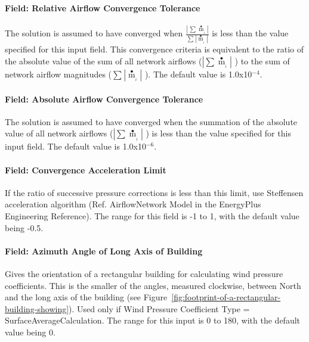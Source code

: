 \paragraph{Field: Relative Airflow Convergence Tolerance}\label{field-relative-airflow-convergence-tolerance}

The solution is assumed to have converged when \({\frac{{\left| {\,\sum\limits_{} {{{\mathop m\limits^ \bullet }_{_i}}} } \right|}}{\sum\limits_{} {\left| {{{\mathop m\limits^ \bullet }_{_i}}} \right|} }}\) is less than the value specified for this input field. This convergence criteria is equivalent to the ratio of the absolute value of the sum of all network airflows (\(\left| {\sum {{{\mathop m\limits^ \bullet }_{_i}}} } \right|\) ) to the sum of network airflow magnitudes (\(\sum\limits_{}^{} {\left| {{{\mathop m\limits^ \bullet }_{_i}}} \right|}\) ). The default value is 1.0x10\(^{-4}\).

\paragraph{Field: Absolute Airflow Convergence Tolerance}\label{field-absolute-airflow-convergence-tolerance}

The solution is assumed to have converged when the summation of the absolute value of all network airflows (\(\left| {\sum {{{\mathop m\limits^ \bullet }_{_i}}} } \right|\) ) is less than the value specified for this input field. The default value is 1.0x10\(^{-6}\).

\paragraph{Field: Convergence Acceleration Limit}\label{field-convergence-acceleration-limit}

If the ratio of successive pressure corrections is less than this limit, use Steffensen acceleration algorithm (Ref. AirflowNetwork Model in the EnergyPlus Engineering Reference). The range for this field is -1 to 1, with the default value being -0.5.

\paragraph{Field: Azimuth Angle of Long Axis of Building}\label{field-azimuth-angle-of-long-axis-of-building}

Gives the orientation of a rectangular building for calculating wind pressure coefficients. This is the smaller of the angles, measured clockwise, between North and the long axis of the building (see Figure~\ref{fig:footprint-of-a-rectangular-building-showing}). Used only if Wind Pressure Coefficient Type = SurfaceAverageCalculation. The range for this input is 0 to 180, with the default value being 0.

